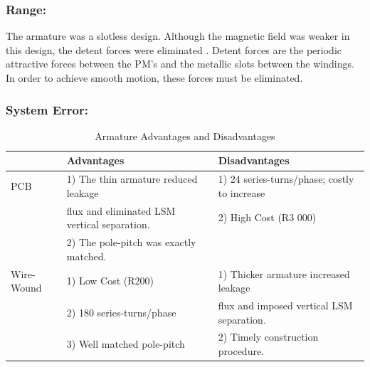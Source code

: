 \documentclass[10pt,twocolumn]{witseiepaper}
\begin{document}
\subsubsection*{Range:}

The armature was a slotless design.  Although the magnetic field was weaker in
this design, the detent forces were eliminated \cite{Tubular,XY-Thrust}.
Detent forces are the periodic attractive forces between the PM's and the
metallic slots between the windings.  In order to achieve smooth motion, these
forces must be eliminated. 

\subsubsection*{System Error:}

\begin{table}[ht!]
	\centering
	\caption{Armature Advantages and Disadvantages}
		\begin{tabular}{lll}
			\hline
													&	{\msbf Advantages} 						& {\msbf Disadvantages}\\
			\hline
			{\msbf PCB}					& 1) The thin armature reduced leakage  			& 1) 24 series-turns/phase; costly to increase\\
													& flux and eliminated LSM vertical separation.& 2) High Cost (R3 000)\\
													& 2) The pole-pitch was exactly matched.\\													
			\hline
			{\msbf Wire-Wound}	& 1) Low Cost (R200)										& 1) Thicker armature increased leakage\\ 
													& 2) 180 series-turns/phase			& flux and imposed vertical LSM separation.\\
													& 3) Well matched pole-pitch  	& 2) Timely construction procedure.\\						\hline
		\end{tabular}
	\label{tab:Armatures}
\end{table}


 
\end{document}
